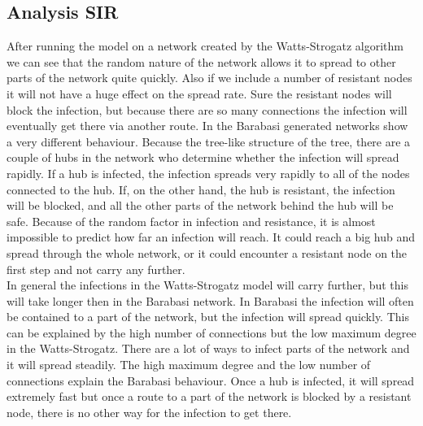 \documentclass[a4paper]{article}
\theoremstyle{definition}
\begin{document}
\newpage
\subsection{Analysis SIR}
After running the model on a network created by the Watts-Strogatz algorithm we can see that the random nature of the network allows it to spread to other parts of the network quite quickly. Also if we include a number of resistant nodes it will not have a huge effect on the spread rate. Sure the resistant nodes will block the infection, but because there are so many connections the infection will eventually get there via another route. 
In the Barabasi generated networks show a very different behaviour. Because
the tree-like structure of the tree, there are a couple of hubs in the
network who determine whether the infection will spread rapidly. If a hub is
infected, the infection spreads very rapidly to all of the nodes connected
to the hub. If, on the other hand, the hub is resistant, the infection will
be blocked, and all the other parts of the network behind the hub will be
safe. Because of the random factor in infection and resistance, it is almost
impossible to predict how far an infection will reach. It could reach a big
hub and spread through the whole network, or it could encounter a resistant
node on the first step and not carry any further.\\

In general the infections in the Watts-Strogatz model will carry further, but this will take longer then in the Barabasi network. In Barabasi the infection will often be contained to a part of the network, but the infection will spread quickly. 
This can be explained by the high number of connections but the low maximum degree in the Watts-Strogatz. There are a lot of ways to infect parts of the network and it will spread steadily. The high maximum degree and the low number of connections explain the Barabasi behaviour. Once a hub is infected, it will spread extremely fast but once a route to a part of the network is blocked by a resistant node, there is no other way for the infection to get there.

\newpage
\appendix
\end{document}
